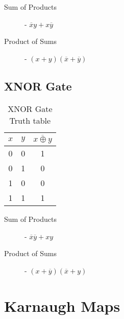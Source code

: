 \documentclass[12pt letter]{report}
\begin{document}
\begin{description}
  \item[Sum of Products]  - $\overline{x}y + x\overline{y}$
  \item[Product of Sums] - $ \left( x + y \right) \left( \overline{x} + \overline{y} \right)  $
\end{description}

\section{XNOR Gate}

\begin{table}[h!]
  \caption{XNOR Gate Truth table}\label{tab:xnor}
  \begin{center}
    \begin{tabular}{|c c|c|}
      \hline
      $x$ & $y$ & $\overline{x \oplus y}$ \\ [0.5ex]
      \hline
      \hline
      0   & 0   & 1                       \\
      0   & 1   & 0                       \\
      1   & 0   & 0                       \\
      1   & 1   & 1                       \\
      \hline
    \end{tabular}
  \end{center}
\end{table}

\begin{description}
  \item[Sum of Products]  - $\overline{x}\overline{y} + xy$
  \item[Product of Sums] - $ \left( x + \overline{y} \right) \left( \overline{x} + y \right)  $
\end{description}

\chapter{Karnaugh Maps}

\end{document}
